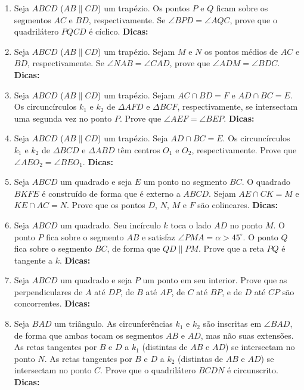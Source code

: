 \documentclass{article}
\newcommand{\dica}{\textbf{Dicas:}}
\begin{document}
\begin{multicols}{2}
\begin{enumerate}
    \item Seja $ABCD$ ($AB\parallel CD$) um trapézio. Os pontos $P$ e $Q$ ficam sobre os segmentos $AC$ e $BD$, respectivamente. Se $\angle BPD=\angle AQC$, prove que o quadrilátero $PQCD$ é cíclico. \dica %
    
    \item Seja $ABCD$ ($AB\parallel CD$) um trapézio. Sejam $M$ e $N$ os pontos médios de $AC$ e $BD$, respectivamente. Se $\angle NAB=\angle CAD$, prove que $\angle ADM=\angle BDC$. \dica %
    
    \item Seja $ABCD$ ($AB\parallel CD$) um trapézio. Sejam $AC\cap BD=F$ e $AD\cap BC=E$. Os circuncírculos $k_1$ e $k_2$ de $\Delta AFD$ e $\Delta BCF$, respectivamente, se intersectam uma segunda vez no ponto $P$. Prove que $\angle AEF=\angle BEP$. \dica %
    
    \item Seja $ABCD$ ($AB\parallel CD$) um trapézio. Seja $AD\cap BC=E$. Os circuncírculos $k_1$ e $k_2$ de $\Delta BCD$ e $\Delta ABD$ têm centros $O_1$ e $O_2$, respectivamente. Prove que $\angle AEO_2=\angle BEO_1$. \dica %
    
    \item Seja $ABCD$ um quadrado e seja $E$ um ponto no segmento $BC$. O quadrado $BKFE$ é construído de forma que é externo a $ABCD$. Sejam $AE\cap CK=M$ e $KE\cap AC=N$. Prove que os pontos $D$, $N$, $M$ e $F$ são colineares. \dica %
    
    \item Seja $ABCD$ um quadrado. Seu incírculo $k$ toca o lado $AD$ no ponto $M$. O ponto $P$ fica sobre o segmento $AB$ e satisfaz $\angle PMA=\alpha>45^{\circ}$. O ponto $Q$ fica sobre o segmento $BC$, de forma que $QD\parallel PM$. Prove que a reta $PQ$ é tangente a $k$. \dica %
    
    \item Seja $ABCD$ um quadrado e seja $P$ um ponto em seu interior. Prove que as perpendiculares de $A$ até $DP$, de $B$ até $AP$, de $C$ até $BP$, e de $D$ até $CP$ são concorrentes. \dica %
    
    \item Seja $BAD$ um triângulo. As circunferências $k_1$ e $k_2$ são inscritas em $\angle BAD$, de forma que ambas tocam os segmentos $AB$ e $AD$, mas não suas extensões. As retas tangentes por $B$ e $D$ a $k_1$ (distintas de $AB$ e $AD$) se intersectam no ponto $N$. As retas tangentes por $B$ e $D$ a $k_2$ (distintas de $AB$ e $AD$) se intersectam no ponto $C$. Prove que o quadrilátero $BCDN$ é circunscrito. \dica %
    

\end{enumerate}
\end{multicols}
\end{document}
